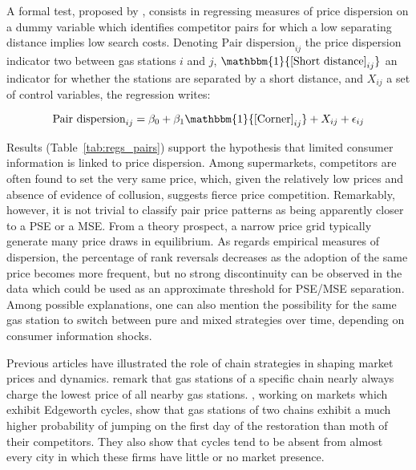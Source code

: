 \documentclass[english]{article}
\begin{document}
A formal test, proposed by \cite{TAP11}, consists in regressing measures of price dispersion on a dummy variable which identifies competitor pairs for which a low separating distance implies low search costs. Denoting $\text{Pair dispersion}_{ij}$ the price dispersion indicator two between gas stations $i$ and $j$, $\mathbbm{1}{\text{[Short distance]}_{ij}}$ an indicator for whether the stations are separated by a short distance, and $X_{ij}$ a set of control variables, the regression writes:

\begin{equation}
\text{Pair dispersion}_{ij}= \beta_0 + \beta_1 \mathbbm{1}{\text{[Corner]}_{ij}} + X_{ij} + \epsilon_{ij}
\end{equation}

Results (Table~\ref{tab:regs_pairs}) support the hypothesis that limited consumer information is linked to price dispersion. Among supermarkets, competitors are often found to set the very same price, which, given the relatively low prices and absence of evidence of collusion, suggests fierce price competition. Remarkably, however, it is not trivial to classify pair price patterns as being apparently closer to a PSE or a MSE. From a theory prospect, a narrow price grid typically generate many price draws in equilibrium. As regards empirical measures of dispersion, the percentage of rank reversals decreases as the adoption of the same price becomes more frequent, but no strong discontinuity can be observed in the data which could be used as an approximate threshold for PSE/MSE separation. Among possible explanations, one can also mention the possibility for the same gas station to switch between pure and mixed strategies over time, depending on consumer information shocks.

Previous articles have illustrated the role of chain strategies in shaping market prices and dynamics. \cite{HOS08} remark that gas stations of a specific chain nearly always charge the lowest price of all nearby gas stations. \cite{LEW12}, working on markets which exhibit Edgeworth cycles, show that gas stations of two chains exhibit a much higher probability of jumping on the first day of the restoration than moth of their competitors. They also show that cycles tend to be absent from almost every city in which these firms have little or no market presence.
\end{document}
